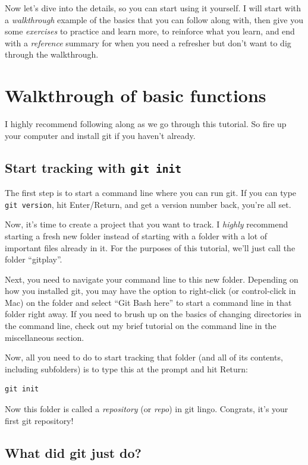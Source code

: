 \documentclass{article}
\begin{document}
Now let's dive into the details, so you can start using it yourself. I will start with a \emph{walkthrough} example of the basics that you can follow along with, then give you some \emph{exercises} to practice and learn more, to reinforce what you learn, and end with a \emph{reference} summary for when you need a refresher but don't want to dig through the walkthrough.
\section{Walkthrough of basic functions}
\label{sec-5}

I highly recommend following along as we go through this tutorial. So fire up your computer and install git if you haven't already.
\subsection{Start tracking with \texttt{git init}}
\label{sec-5-1}

The first step is to start a command line where you can run git.  If you can type \texttt{git version}, hit Enter/Return, and get a version number back, you're all set.

Now, it's time to create a project that you want to track.  I \emph{highly} recommend starting a fresh new folder instead of starting with a folder with a lot of important files already in it.  For the purposes of this tutorial, we'll just call the folder ``gitplay''.

Next, you need to navigate your command line to this new folder.  Depending on how you installed git, you may have the option to right-click (or control-click in Mac) on the folder and select ``Git Bash here'' to start a command line in that folder right away. If you need to brush up on the basics of changing directories in the command line, check out my brief tutorial on the command line in the miscellaneous section.

Now, all you need to do to start tracking that folder (and all of its contents, including subfolders) is to type this at the prompt and hit Return:


\begin{verbatim}
git init
\end{verbatim}

Now this folder is called a \emph{repository} (or \emph{repo}) in git lingo.  Congrats, it's your first git repository!
\subsection{What did git just do?}
\label{sec-5-2}
\end{document}
